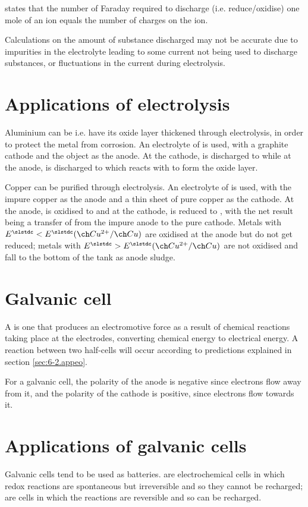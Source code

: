 \documentclass[Chemistry.tex]{subfiles}
\begin{document}
 states that the number of Faraday required to discharge (i.e. reduce/oxidise) one mole of an ion equals the number of charges on the ion.

Calculations on the amount of substance discharged may not be accurate due to impurities in the electrolyte leading to some current not being used to discharge substances, or fluctuations in the current during electrolysis.
\section{Applications of electrolysis}
Aluminium can be  i.e. have its oxide layer thickened through electrolysis, in order to protect the metal from corrosion. An electrolyte of  is used, with a graphite cathode and the object as the anode. At the cathode,  is discharged to  while at the anode,  is discharged to  which reacts with  to form the oxide layer.

Copper can be purified through electrolysis. An electrolyte of  is used, with the impure copper as the anode and a thin sheet of pure copper as the cathode. At the anode,  is oxidised to  and at the cathode,  is reduced to , with the net result being a transfer of  from the impure anode to the pure cathode. Metals with \(\slEo{} < \slEorr{Cu^{2+}}{Cu}\) are oxidised at the anode but do not get reduced; metals with \(\slEo > \slEorr{Cu^{2+}}{Cu}\) are not oxidised and fall to the bottom of the tank as anode sludge.
\section{Galvanic cell}
A  is one that produces an electromotive force as a result of chemical reactions taking place at the electrodes, converting chemical energy to electrical energy. A reaction between two half-cells will occur according to predictions explained in section \ref{sec:6-2.appeo}.

For a galvanic cell, the polarity of the anode is negative since electrons flow away from it, and the polarity of the cathode is positive, since electrons flow towards it.
\section{Applications of galvanic cells}
Galvanic cells tend to be used as batteries.  are electrochemical cells in which redox reactions are spontaneous but irreversible and so they cannot be recharged;  are cells in which the reactions are reversible and so can be recharged.
\end{document}
